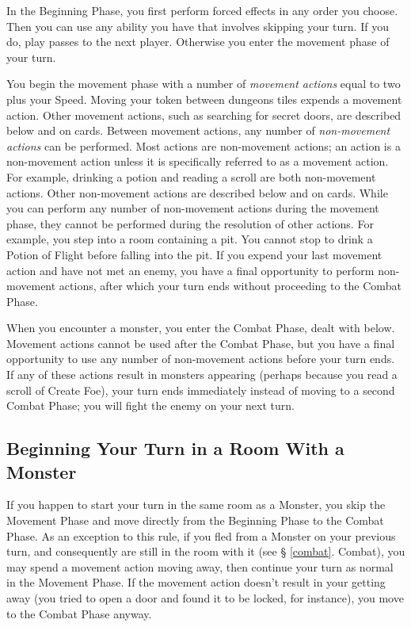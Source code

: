 \documentclass{book}
\begin{document}
In the Beginning Phase, you first perform forced effects in any order you choose. Then you can use any ability you have that involves skipping your turn. If you do, play passes to the next player. Otherwise you enter the movement phase of your turn.

You begin the movement phase with a number of \emph{movement actions} equal to two plus your Speed. Moving your token between dungeons tiles expends a movement action. Other movement actions, such as searching for secret doors, are described below and on cards.
Between movement actions, any number of \emph{non-movement actions} can be performed. Most actions are non-movement actions; an action is a non-movement action unless it is specifically referred to as a movement action.  For example, drinking a potion and reading a scroll are both non-movement actions. Other non-movement actions are described below and on cards.
While you can perform any number of non-movement actions during the movement phase, they cannot be performed during the resolution of other actions. For example, you step into a room containing a pit. You cannot stop to drink a Potion of Flight before falling into the pit.
If you expend your last movement action and have not met an enemy, you have a final opportunity to perform non-movement actions, after which your turn ends without proceeding to the Combat Phase.

When you encounter a monster, you enter the Combat Phase, dealt with below. Movement actions cannot be used after the Combat Phase, but you have a final opportunity to use any number of non-movement actions before your turn ends. If any of these actions result in monsters appearing (perhaps because you read a scroll of Create Foe), your turn ends immediately instead of moving to a second Combat Phase; you will fight the enemy on your next turn.

\subsection{Beginning Your Turn in a Room With a Monster} \label{beginRoomMonster}

If you happen to start your turn in the same room as a Monster, you skip the Movement Phase and move directly from the Beginning Phase to the Combat Phase. As an exception to this rule, if you fled from a Monster on your previous turn, and consequently are still in the room with it (see § \ref{combat}. Combat), you may spend a movement action moving away, then continue your turn as normal in the Movement Phase. If the movement action doesn’t result in your getting away (you tried to open a door and found it to be locked, for instance), you move to the Combat Phase anyway.
\end{document}
